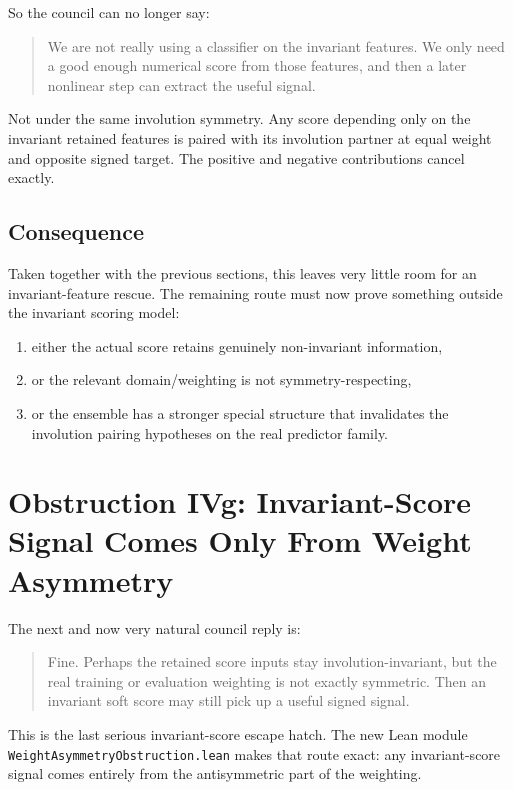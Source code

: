 \documentclass[11pt]{article}
\theoremstyle{remark}
\begin{document}
So the council can no longer say:
\begin{quote}
We are not really using a classifier on the invariant features.  We only need a good enough
numerical score from those features, and then a later nonlinear step can extract the useful
signal.
\end{quote}

Not under the same involution symmetry.  Any score depending only on the invariant retained
features is paired with its involution partner at equal weight and opposite signed target.  The
positive and negative contributions cancel exactly.

\subsection{Consequence}

Taken together with the previous sections, this leaves very little room for an invariant-feature
rescue.  The remaining route must now prove something outside the invariant scoring model:
\begin{enumerate}[leftmargin=1.5em]
  \item either the actual score retains genuinely non-invariant information,
  \item or the relevant domain/weighting is not symmetry-respecting,
  \item or the ensemble has a stronger special structure that invalidates the involution pairing
  hypotheses on the real predictor family.
\end{enumerate}

\section{Obstruction IVg: Invariant-Score Signal Comes Only From Weight Asymmetry}

The next and now very natural council reply is:
\begin{quote}
Fine.  Perhaps the retained score inputs stay involution-invariant, but the real training or
evaluation weighting is not exactly symmetric.  Then an invariant soft score may still pick up a
useful signed signal.
\end{quote}

This is the last serious invariant-score escape hatch.  The new Lean module
\texttt{WeightAsymmetryObstruction.lean} makes that route exact: any invariant-score signal comes
entirely from the antisymmetric part of the weighting.
\end{document}
